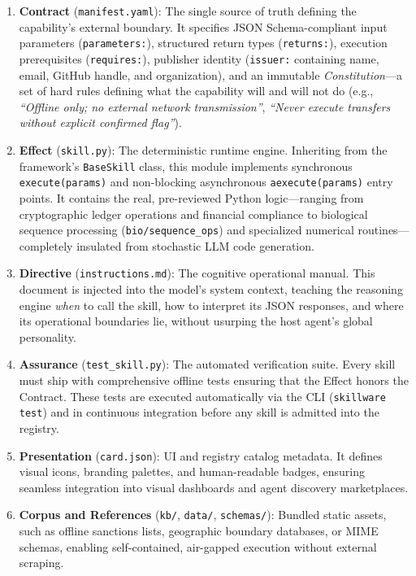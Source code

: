 \begin{enumerate}[leftmargin=*]
  \item \textbf{Contract} (\texttt{manifest.yaml}): The single source of truth defining the capability's external boundary. It specifies JSON Schema-compliant input parameters (\texttt{parameters:}), structured return types (\texttt{returns:}), execution prerequisites (\texttt{requires:}), publisher identity (\texttt{issuer:} containing name, email, GitHub handle, and organization), and an immutable \emph{Constitution}---a set of hard rules defining what the capability will and will not do (e.g., \emph{``Offline only; no external network transmission''}, \emph{``Never execute transfers without explicit confirmed flag''}).
  \item \textbf{Effect} (\texttt{skill.py}): The deterministic runtime engine. Inheriting from the framework's \texttt{BaseSkill} class, this module implements synchronous \texttt{execute(params)} and non-blocking asynchronous \texttt{aexecute(params)} entry points. It contains the real, pre-reviewed Python logic---ranging from cryptographic ledger operations and financial compliance to biological sequence processing (\texttt{bio/sequence\_ops}) and specialized numerical routines---completely insulated from stochastic LLM code generation.
  \item \textbf{Directive} (\texttt{instructions.md}): The cognitive operational manual. This document is injected into the model's system context, teaching the reasoning engine \emph{when} to call the skill, how to interpret its JSON responses, and where its operational boundaries lie, without usurping the host agent's global personality.
  \item \textbf{Assurance} (\texttt{test\_skill.py}): The automated verification suite. Every skill must ship with comprehensive offline tests ensuring that the Effect honors the Contract. These tests are executed automatically via the CLI (\texttt{skillware test}) and in continuous integration before any skill is admitted into the registry.
  \item \textbf{Presentation} (\texttt{card.json}): UI and registry catalog metadata. It defines visual icons, branding palettes, and human-readable badges, ensuring seamless integration into visual dashboards and agent discovery marketplaces.
  \item \textbf{Corpus and References} (\texttt{kb/}, \texttt{data/}, \texttt{schemas/}): Bundled static assets, such as offline sanctions lists, geographic boundary databases, or MIME schemas, enabling self-contained, air-gapped execution without external scraping.
\end{enumerate}

